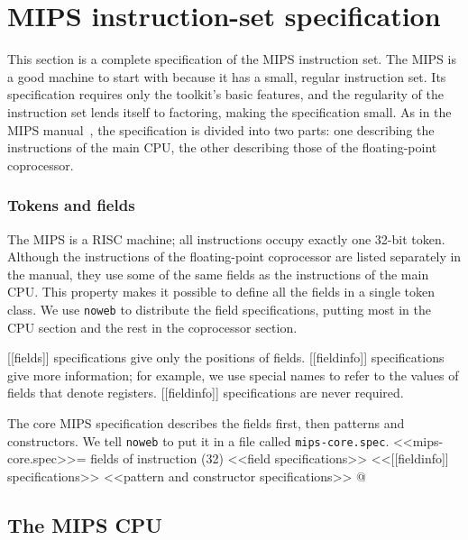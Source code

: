 

\section{MIPS instruction-set specification}
This section is a complete specification of the MIPS instruction set.
The MIPS is a good machine to start with
because it has a small, regular instruction set.
Its specification
requires only the toolkit's basic features, and the regularity of the
instruction set lends itself to factoring, making the specification
small. 
As in the MIPS manual~\cite{kane:mips}, the specification is divided into
two parts: one describing the instructions of the main CPU, the other
describing those of the floating-point coprocessor.

\subsubsection*{Tokens and fields}

The MIPS is a RISC machine; all instructions occupy exactly one 
32-bit token.  
Although the instructions of the floating-point coprocessor are listed
separately in the manual, they use some of the same fields as the
instructions of the main CPU.
This property makes it possible to define all the fields in a single 
token class.
We use {\tt noweb} to distribute the field specifications, putting 
most in the CPU section and the rest in the coprocessor section.

 [[fields]] specifications give only the positions of fields.
 [[fieldinfo]] specifications give more information;
for example, we use special names to refer to the values of
fields that denote registers.
[[fieldinfo]] specifications are never required.

The core MIPS specification 
describes the fields first, then patterns and
constructors.
We tell {\tt noweb} to put it in a file called {\tt mips-core.spec}.
<<mips-core.spec>>=
fields of instruction (32) <<field specifications>>
<<[[fieldinfo]] specifications>>
<<pattern and constructor specifications>>
@
\subsection{The MIPS CPU}

